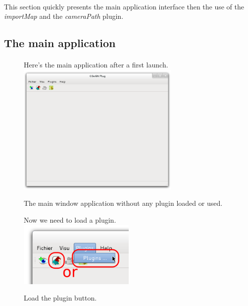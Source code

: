 \documentclass[a4paper]{scrreprt}
\begin{document}
	\paragraph{}
	This section quickly presents the main application interface then the use of
	the	\textit{importMap} and the \textit{cameraPath} plugin.
	
\subsection{The main application}
	\paragraph{}
	\begin{figure}[h!p]
	Here's the main application after a first launch.
	  \centering
	    \includegraphics[width=0.7\textwidth]{images/screenshot1}
	  \caption{The main window application without any plugin loaded or used.}
	\end{figure}
	\begin{figure}[h!p]
	Now we need to load a plugin.\\
	  \centering
	    \includegraphics[width=0.5\textwidth]{images/screenshot2}
	  \caption{Load the plugin button.}
	\end{figure}
\end{document}
